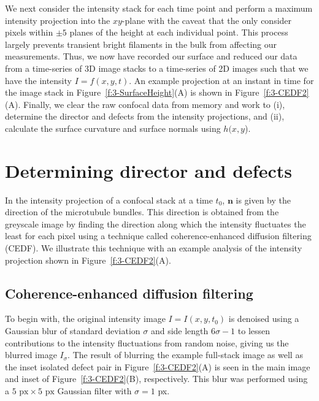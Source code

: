 We next consider the intensity stack for each time point and perform a maximum intensity projection into the $xy$-plane with the caveat that the only consider pixels within $\pm 5$ planes of the height at each individual point.
This process largely prevents transient bright filaments in the bulk from affecting our measurements.
Thus, we now have recorded our surface and reduced our data from a time-series of 3D image stacks to a time-series of 2D images such that we have the intensity $I = f(x,y,t)$.
An example projection at an instant in time for the image stack in Figure~\ref{f:3-SurfaceHeight}(A) is shown in Figure~\ref{f:3-CEDF2}(A).
Finally, we clear the raw confocal data from memory and work to (i), determine the director and defects from the intensity projections, and (ii), calculate the surface curvature and surface normals using $h(x,y$).




\section{Determining director and defects}
In the intensity projection of a confocal stack at a time $t_0$, $\mathbf{n}$ is given by the direction of the microtubule bundles.
This direction is obtained from the greyscale image by finding the direction along which the intensity fluctuates the least for each pixel using a technique called coherence-enhanced diffusion filtering (CEDF)\cite{RN30}.
We illustrate this technique with an example analysis of the intensity projection shown in Figure~\ref{f:3-CEDF2}(A).


\subsection{Coherence-enhanced diffusion filtering}
To begin with, the original intensity image $I = I(x,y,t_0)$ is denoised using a Gaussian blur of standard deviation $\sigma$ and side length $6 \sigma -1$ to lessen contributions to the intensity fluctuations from random noise, giving us the blurred image $I_{\sigma}$.
The result of blurring the example full-stack image as well as the inset isolated defect pair in Figure~\ref{f:3-CEDF2}(A) is seen in the main image and inset of Figure~\ref{f:3-CEDF2}(B), respectively.
This blur was performed using a $5 \textrm{ px} \times 5 \textrm{ px}$ Gaussian filter with $\sigma= 1$ px.

